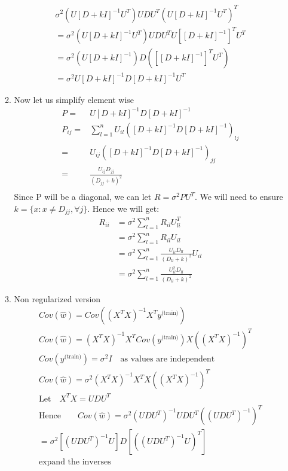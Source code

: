 \documentclass[a4paper]{article}
\begin{document}
\begin{enumerate}
\begin{enumerate}
\begin{gather*}
 		  \sigma^2 (U [D + kI]^{-1}U^{T}) UDU^T (U [D + kI]^{-1}U^{T})^T\\
 		  = \sigma^2 (U [D + kI]^{-1}U^{T}) UDU^T U [[D + kI]^{-1}]^TU^{T}\\
 		  = \sigma^2 (U [D + kI]^{-1})D ([[D + kI]^{-1}]^T U^T)\\
 		  = \sigma^2 U [D+kI]^{-1} D [D + kI]^{-1} U^{T}
	\end{gather*}
	\item Now let us simplify element wise
	\begin{align*}
		P = &U [D+kI]^{-1} D [D + kI]^{-1}\\
		P_{ij} = & \sum\limits_{l = 1}^n U_{il} ([D+kI]^{-1} D [D + kI]^{-1})_{lj}\\
		= & U_{ij} ([D+kI]^{-1} D [D + kI]^{-1})_{jj}\\
		= & \frac{U_{ij} D_{jj}}{(D_{jj} + k)^2}\\
	\end{align*}
	Since P will be a diagonal, we can let $R = \sigma^2 PU^T$. We will need to ensure $k = \{ x : x \neq D_{jj}, \forall j \}$. Hence we will get:\\	
	\begin{align*}
		R_{ii} & = \sigma^2  \sum\limits_{l=1}^n R_{il} U_{li}^T\\
		& = \sigma^2 \sum\limits_{l=1}^n R_{il} U_{il} \\
		& = \sigma^2 \sum\limits_{l=1}^n \frac{U_{il} D_{ll}}{(D_{ll} + k)^2} U_{il}\\
		& = \sigma^2  \sum\limits_{l=1}^n \frac{U_{il}^2 D_{ll}}{(D_{ll} + k)^2}
	\end{align*}
	\item Non regularized version
	\begin{gather*}
		Cov(\hat{w}) = Cov((X^TX)^{-1} X^Ty^{\text{(train)}})\\
		Cov(\hat{w}) = (X^TX)^{-1} X^T Cov(y^{\text{(train)}}) X ((X^TX)^{-1})^T\\
		Cov(y^{\text{(train)}}) = \sigma^2 I \quad \text{as values are independent}\\
		Cov(\hat{w}) = \sigma^2 (X^TX)^{-1} X^T  X ((X^TX)^{-1})^T\\
		\text{Let}\quad 		X^T X = UDU^T\\
		\text{Hence} \qquad Cov(\hat{w}) = \sigma^2 (UDU^T)^{-1} UDU^T ((UDU^T)^{-1})^T\\
		= \sigma^2 [(UDU^T)^{-1} U]D[ ((UDU^T)^{-1} U)^T ]\\
		\text{expand the inverses}\\

\end{gather*}
\end{enumerate}
\end{enumerate}
\end{document}
